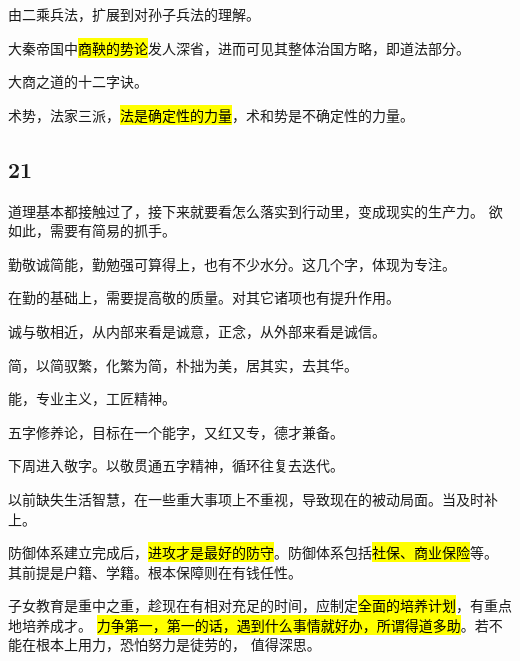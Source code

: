 \hrulefill

由二乘兵法，扩展到对孙子兵法的理解。

大秦帝国中\hl{商鞅的势论}发人深省，进而可见其整体治国方略，即道法部分。

大商之道的十二字诀。

术势，法家三派，\hl{法是确定性的力量}，术和势是不确定性的力量。

\subsection{21}

道理基本都接触过了，接下来就要看怎么落实到行动里，变成现实的生产力。
欲如此，需要有简易的抓手。

勤敬诚简能，勤勉强可算得上，也有不少水分。这几个字，体现为专注。

在勤的基础上，需要提高敬的质量。对其它诸项也有提升作用。

诚与敬相近，从内部来看是诚意，正念，从外部来看是诚信。

简，以简驭繁，化繁为简，朴拙为美，居其实，去其华。

能，专业主义，工匠精神。

五字修养论，目标在一个能字，又红又专，德才兼备。

下周进入敬字。以敬贯通五字精神，循环往复去迭代。

\hrulefill

以前缺失生活智慧，在一些重大事项上不重视，导致现在的被动局面。当及时补上。

防御体系建立完成后，\hl{进攻才是最好的防守}。防御体系包括\hl{社保、商业保险}等。
其前提是户籍、学籍。根本保障则在有钱任性。

子女教育是重中之重，趁现在有相对充足的时间，应制定\hl{全面的培养计划}，有重点地培养成才。
\hl{力争第一，第一的话，遇到什么事情就好办，所谓得道多助}。若不能在根本上用力，恐怕努力是徒劳的，
值得深思。
